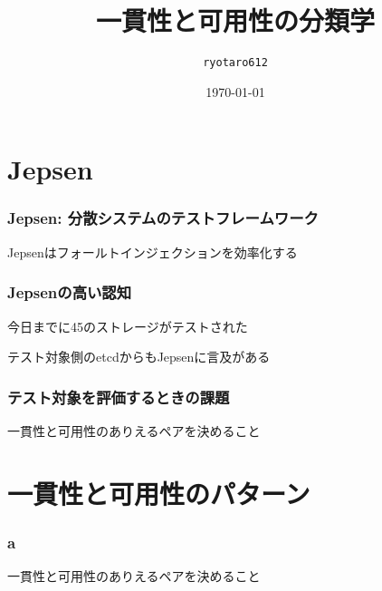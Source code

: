 \documentclass[unicode, 14pt, aspectratio=169]{beamer}
\date{\today}
\title{一貫性と可用性の分類学}
\author{\texttt{ryotaro612}}
\begin{document}
\begin{frame}
\titlepage
\end{frame}
\section{Jepsen}
\begin{frame}[t]
  \frametitle{Jepsen: 分散システムのテストフレームワーク}
  {\large Jepsenはフォールトインジェクションを効率化する}
\end{frame}
\begin{frame}[t]
  \frametitle{Jepsenの高い認知}
  {\large 今日までに45のストレージがテストされた}
  \par
  テスト対象側のetcdからもJepsenに言及がある
\end{frame}
\begin{frame}[t]
  \frametitle{テスト対象を評価するときの課題}
  {\large 一貫性と可用性のありえるペアを決めること}
\end{frame}
\section{一貫性と可用性のパターン}
\begin{frame}[t]
  \frametitle{a}
  {\large 一貫性と可用性のありえるペアを決めること}
\end{frame}
\end{document}
